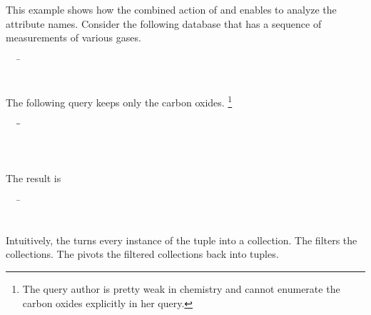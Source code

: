 \begin{example}
This example shows how the combined action of  and 
enables to analyze the attribute names. Consider the following database that has
a sequence of measurements of various gases.

\begin{tabbing}
\ \ \ \gt{sensors : [}\=\\
\>\\
\>\gt{]}
\end{tabbing}

The following query keeps only the carbon oxides.
\footnote{The query author is pretty weak in chemistry and cannot enumerate the
carbon oxides explicitly in her query.}

\begin{tabbing}
\ \ \ \=\=\\
\>\>\\
\>\>\\
\>
\end{tabbing}

The result is 

\begin{tabbing}
\ \ \ \gt{[}\=\\
\>\\
\>\gt{]}
\end{tabbing}

Intuitively, the  turns every instance of the tuple  into a
collection. The  filters the collections. The  pivots the
filtered collections back into tuples.
\end{example}
